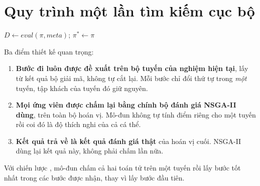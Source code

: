 \section{Quy trình một lần tìm kiếm cục bộ}

\begin{algorithm}[H]
\caption{Một lần tìm kiếm cục bộ trên hoán vị con $\pi$}
\label{alg:ls}
$D \gets \textit{eval}(\pi, \textit{meta})$; $\pi^* \gets \pi$\;
\end{algorithm}

Ba điểm thiết kế quan trọng:
\begin{enumerate}
  \item \textbf{Bước đi luôn được đề xuất trên bộ tuyến của nghiệm hiện tại}, lấy từ kết quả bộ giải mã,
        không tự cắt lại. Mỗi bước chỉ đổi thứ tự trong \emph{một} tuyến, tập khách của tuyến đó giữ nguyên.
  \item \textbf{Mọi ứng viên được chấm lại bằng chính bộ đánh giá NSGA-II dùng}, trên toàn bộ hoán vị.
        Mô-đun không tự tính điểm riêng cho một tuyến rồi coi đó là độ thích nghi của cả cá thể.
  \item \textbf{Kết quả trả về là kết quả đánh giá thật} của hoán vị cuối. NSGA-II dùng lại kết quả này,
        không phải chấm lần nữa.
\end{enumerate}
Với chiến lược , mô-đun chấm cả hai toán tử trên một tuyến rồi lấy bước tốt nhất trong các
bước được nhận, thay vì lấy bước đầu tiên.


